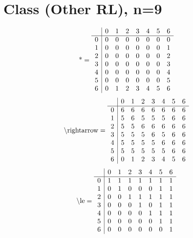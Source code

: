 \documentclass[11pt]{article}
\begin{document}
\section{Class (Other RL), n=9}
\[\text{*} = 
\begin{array}{r | r r r r r r r}
 & 0 & 1 & 2 & 3 & 4 & 5 & 6 \\ \hline
0 & 0 & 0 & 0 & 0 & 0 & 0 & 0 \\
1 & 0 & 0 & 0 & 0 & 0 & 0 & 1 \\
2 & 0 & 0 & 0 & 0 & 0 & 0 & 2 \\
3 & 0 & 0 & 0 & 0 & 0 & 0 & 3 \\
4 & 0 & 0 & 0 & 0 & 0 & 0 & 4 \\
5 & 0 & 0 & 0 & 0 & 0 & 0 & 5 \\
6 & 0 & 1 & 2 & 3 & 4 & 5 & 6 \\
\end{array}
\]
\[\text{\textbackslash rightarrow} = 
\begin{array}{r | r r r r r r r}
 & 0 & 1 & 2 & 3 & 4 & 5 & 6 \\ \hline
0 & 6 & 6 & 6 & 6 & 6 & 6 & 6 \\
1 & 5 & 6 & 5 & 5 & 5 & 6 & 6 \\
2 & 5 & 5 & 6 & 6 & 6 & 6 & 6 \\
3 & 5 & 5 & 5 & 6 & 5 & 6 & 6 \\
4 & 5 & 5 & 5 & 5 & 6 & 6 & 6 \\
5 & 5 & 5 & 5 & 5 & 5 & 6 & 6 \\
6 & 0 & 1 & 2 & 3 & 4 & 5 & 6 \\
\end{array}
\]
\[\text{\textbackslash le} = 
\begin{array}{r | r r r r r r r}
 & 0 & 1 & 2 & 3 & 4 & 5 & 6 \\ \hline
0 & 1 & 1 & 1 & 1 & 1 & 1 & 1 \\
1 & 0 & 1 & 0 & 0 & 0 & 1 & 1 \\
2 & 0 & 0 & 1 & 1 & 1 & 1 & 1 \\
3 & 0 & 0 & 0 & 1 & 0 & 1 & 1 \\
4 & 0 & 0 & 0 & 0 & 1 & 1 & 1 \\
5 & 0 & 0 & 0 & 0 & 0 & 1 & 1 \\
6 & 0 & 0 & 0 & 0 & 0 & 0 & 1 \\
\end{array}
\]
\end{document}
